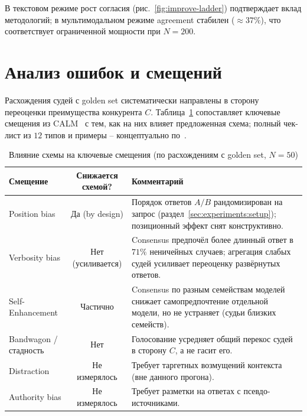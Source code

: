 В текстовом режиме рост согласия (рис.~\ref{fig:improve-ladder}) подтверждает вклад методологий; в мультимодальном режиме agreement стабилен ($\approx 37\%$), что соответствует ограниченной мощности при $N = 200$.

\section{Анализ ошибок и смещений}
\label{sec:results:errors}

Расхождения судей с golden set систематически направлены в сторону
переоценки преимущества конкурента $C$. Таблица~\ref{tab:results-bias}
сопоставляет ключевые смещения из CALM~\cite{ye2024justice} с тем, как на
них влияет предложенная схема; полный чек-лист из $12$ типов и примеры --
концептуально по~\cite{ye2024justice}.

\begin{table}[htbp]
    \centering
    \caption{Влияние схемы на ключевые смещения (по расхождениям с golden
        set, $N = 50$)}
    \label{tab:results-bias}
    \begin{tabular}{lcp{6.4cm}}
        \toprule
        Смещение & Снижается схемой? & Комментарий \\
        \midrule
        Position bias & Да (by design) &
            Порядок ответов $A/B$ рандомизирован на запрос
            (раздел~\ref{sec:experiments:setup}); позиционный эффект снят
            конструктивно. \\
        Verbosity bias & Нет (усиливается) &
            Consensus предпочёл более длинный ответ в $71\%$ неничейных
            случаев; агрегация слабых судей усиливает переоценку
            развёрнутых ответов. \\
        Self-Enhancement & Частично &
            Consensus по разным семействам моделей снижает самопредпочтение
            отдельной модели, но не устраняет (судьи близких семейств). \\
        Bandwagon / стадность & Нет &
            Голосование усредняет общий перекос судей в сторону $C$, а не
            гасит его. \\
        Distraction & Не измерялось &
            Требует таргетных возмущений контекста (вне данного прогона). \\
        Authority bias & Не измерялось &
            Требует разметки на ответах с псевдо-источниками. \\
        \bottomrule
    \end{tabular}
\end{table}

